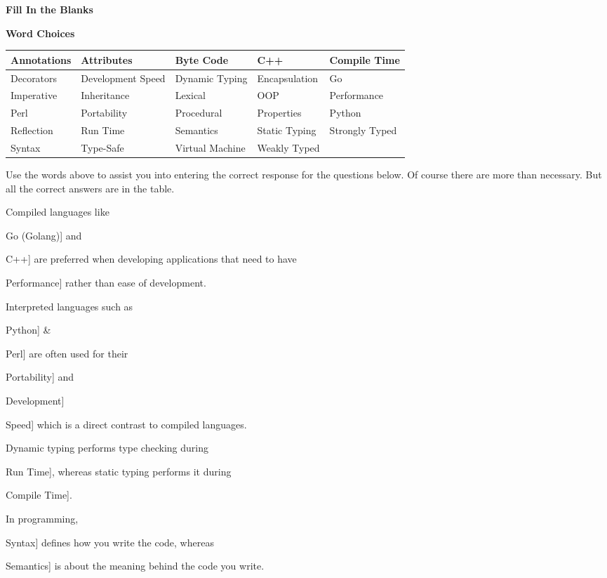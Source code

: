 \documentclass[12pt, addpoints, answers]{exam}
\newif\ifprintanswers
\newcommand{\fillin}[1]{%
  \ifprintanswers
    \textbf{#1}%
  \else
    \underline{\hspace{2mm}}%
  \fi
}
\begin{document}
\begin{questions}
\newpage
\newpage 
\Huge 
\hspace{-1.5cm}
\textbf{Fill In the Blanks}\\
\normalsize 


\begin{table}[ht]
\centering
\large
\textbf{Word Choices}\\
\vspace{.5cm}
\small
\setlength{\tabcolsep}{5pt} %
\renewcommand{\arraystretch}{1.5} %
\begin{tabular}{|m{3cm}|m{3cm}|m{3cm}|m{3cm}|m{3cm}|}
\hline
Annotations & Attributes & Byte Code & C++ & Compile Time \\ \hline
Decorators & Development Speed & Dynamic Typing & Encapsulation & Go \\ \hline
Imperative & Inheritance & Lexical & OOP & Performance \\ \hline
Perl & Portability & Procedural & Properties & Python \\ \hline
Reflection & Run Time & Semantics & Static Typing & Strongly Typed \\ \hline
Syntax & Type-Safe & Virtual Machine & Weakly Typed &  \\ \hline
\end{tabular}
\end{table}

Use the words above to assist you into entering the correct response for the questions below. Of course there are more than necessary. But all the correct answers are in the table.

\large

\question Compiled languages like \fillin[Go (Golang)] and \fillin[C++] are preferred when developing applications that need to have \fillin[Performance] rather than ease of development.
            
\question Interpreted languages such as \fillin[Python] \& \fillin[Perl] are often used for their \fillin[Portability] and \fillin[Development] \fillin[Speed] which is a direct contrast to compiled languages.
				
\question Dynamic typing performs type checking during \fillin[Run Time], whereas static typing performs it during \fillin[Compile Time].

\question In programming, \fillin[Syntax]  defines how you write the code, whereas \fillin[Semantics]  is about the meaning behind the code you write.
				

\end{questions}
\end{document}
